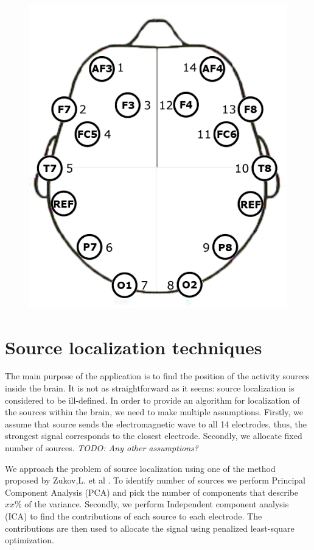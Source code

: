 \documentclass[]{report}   %
\begin{document}
\begin{figure}[!htbp]
\begin{center}
\caption{}
\label{fig:epoc_placement}
\includegraphics[width=0.7\columnwidth]{../Images/epoc_placement} 
\end{center}
\end{figure}
 
\section{Source localization techniques}
The main purpose of the application is to find the position of the activity sources inside the brain. It is not as straightforward as it seems: source localization is considered to be ill-defined. In order to provide an algorithm for localization of the sources within the brain, we need to make multiple assumptions. Firstly, we assume that source sends the electromagnetic wave to all 14 electrodes, thus, the strongest signal corresponds to the closest electrode. Secondly, we allocate fixed number of sources. \emph{TODO: Any other assumptions?}

We approach the problem of source localization using one of the method proposed by Zukov,L. et al \cite{zhukov2000}. To identify number of sources we perform Principal Component Analysis (PCA) and pick the number of components that describe $xx\%$ of the variance. Secondly, we perform Independent component analysis (ICA) to find the contributions of each source to each electrode. The contributions are then used to allocate the signal using penalized least-square optimization.
\end{document}
